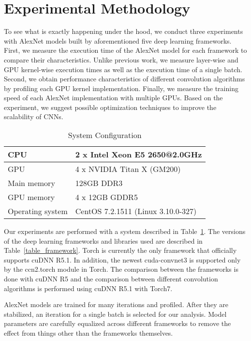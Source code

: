 \section{Experimental Methodology}
To see what is exactly happening under the hood, we conduct three experiments with AlexNet models built by aforementioned five deep learning frameworks. First, we measure the execution time of the AlexNet model for each framework to compare their characteristics. Unlike previous work, we measure layer-wise and GPU kernel-wise execution times as well as the execution time of a single batch. Second, we obtain performance characteristics of different convolution algorithms by profiling each GPU kernel implementation. Finally, we measure the training speed of each AlexNet implementation with multiple GPUs. Based on the experiment, we suggest possible optimization techniques to improve the scalability of CNNs. 

\begin{table}[htbp]
\centering
\caption{System Configuration}
\label{table_system}
\begin{scriptsize}
\begin{tabular}{|l|l|}
\hline\hline
CPU         & 2 x Intel Xeon E5 2650@2.0GHz \\\hline
GPU         & 4 x NVIDIA Titan X (GM200)    \\\hline
Main memory & 128GB DDR3                    \\\hline
GPU memory  & 4 x 12GB GDDR5                \\\hline
Operating system & CentOS 7.2.1511 (Linux 3.10.0-327)  \\\hline
\end{tabular}
\end{scriptsize}
\end{table}

Our experiments are performed with a system described in Table~\ref{table_system}. The versions of the deep learning frameworks and libraries used are described in Table~\ref{table_framework}. Torch is currently the only framework that officially supports cuDNN R5.1. In addition, the newest cuda-convnet3 is supported only by the ccn2.torch module in Torch. The comparison between the frameworks is done with cuDNN R5 and the comparison between different convolution algorithms is performed using cuDNN R5.1 with Torch7.

AlexNet models are trained for many iterations and profiled. After they are stabilized, an iteration for a single batch is selected for our analysis. Model parameters are carefully equalized across different frameworks to remove the effect from things other than the frameworks themselves.